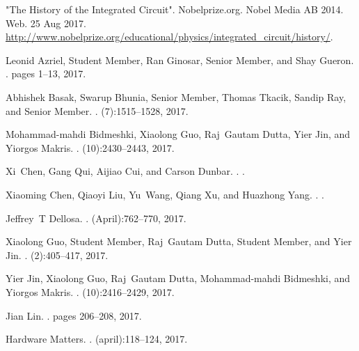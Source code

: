 \documentclass[10pt,journal,compsoc,letterpaper,final]{IEEEtran}
\begin{document}
\begin{thebibliography}{1}

{"The History of the Integrated Circuit". Nobelprize.org. Nobel Media AB 2014. Web. 25 Aug 2017. \url{http://www.nobelprize.org/educational/physics/integrated_circuit/history/}.}

Leonid Azriel, Student Member, Ran Ginosar, Senior Member, and Shay Gueron.
.
\newblock pages 1--13, 2017.

Abhishek Basak, Swarup Bhunia, Senior Member, Thomas Tkacik, Sandip Ray, and
Senior Member.
.
(7):1515--1528, 2017.

Mohammad-mahdi Bidmeshki, Xiaolong Guo, Raj~Gautam Dutta, Yier Jin, and Yiorgos
Makris.
.
(10):2430--2443, 2017.

Xi~Chen, Gang Qui, Aijiao Cui, and Carson Dunbar.
.
.

Xiaoming Chen, Qiaoyi Liu, Yu~Wang, Qiang Xu, and Huazhong Yang.
.
.

Jeffrey~T Dellosa.
.
\newblock (April):762--770, 2017.

Xiaolong Guo, Student Member, Raj~Gautam Dutta, Student Member, and Yier Jin.
.
(2):405--417, 2017.

Yier Jin, Xiaolong Guo, Raj~Gautam Dutta, Mohammad-mahdi Bidmeshki, and Yiorgos
Makris.
.
(10):2416--2429, 2017.

Jian Lin.
.
\newblock pages 206--208, 2017.

Hardware Matters.
.
\newblock (april):118--124, 2017.


\end{thebibliography}
\end{document}
